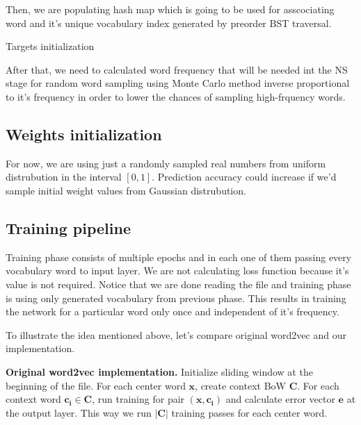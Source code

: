 \documentclass{article}
\newcommand{\SetAlgoStyle}{
	\SetAlgoNoLine
	\SetAlgoNoEnd
	\DontPrintSemicolon
}
\begin{document}
\medbreak

Then, we are populating hash map which is going to be used for asscociating
word and it's unique vocabulary index generated by preorder BST traversal.

\begin{algorithm}[H]
	\SetAlgoStyle
	\caption{Targets initialization}
\end{algorithm}

\medbreak

After that, we need to calculated word frequency that will be needed
int the NS stage for random word sampling using Monte Carlo method inverse
proportional to it's frequency in order to lower the chances of sampling
high-frquency words.

\subsection{Weights initialization}

For now, we are using just a randomly sampled real numbers from uniform distrubution in the interval
$[0, 1]$. Prediction accuracy could increase if we'd sample initial weight values from Gaussian
distrubution.

\subsection{Training pipeline}

Training phase consists of multiple epochs and in each one of them passing
every vocabulary word to input layer. We are not calculating loss function
because it's value is not required. Notice that we are done reading the file
and training phase is using only generated vocabulary from previous phase.
This results in training the network for a particular word only once and
independent of it's frequency.

\medbreak

To illustrate the idea mentioned above, let's compare original word2vec and our implementation.

\textbf{Original word2vec implementation.}
Initialize sliding window at the beginning of the file. For each center word $\boldsymbol{x}$, create context BoW $\boldsymbol{C}$. For each context word $\boldsymbol{c_i} \in \boldsymbol{C}$, run training for pair $(\boldsymbol{x}, \boldsymbol{c_i})$ and calculate error vector $\boldsymbol{e}$ at the output layer. This way we run $|\boldsymbol{C}|$ training passes for each center word.
\end{document}
